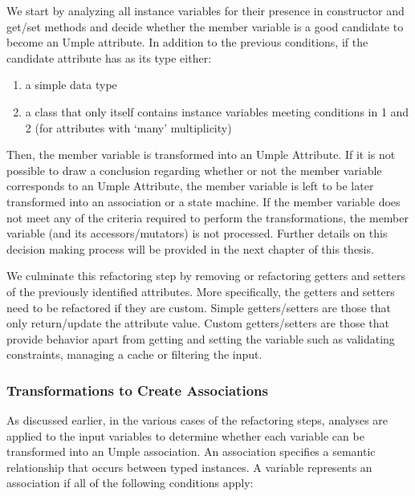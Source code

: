 We start by analyzing all instance variables for their presence in constructor and get/set methods and decide whether the member variable is a good candidate to become an Umple attribute. In addition to the previous conditions, if the candidate attribute has as its type either:

\begin{enumerate}
\item a simple data type
\item a class that only itself contains instance variables meeting conditions in 1 and 2 (for attributes with `many' multiplicity)
\end{enumerate}

Then, the member variable is transformed into an Umple Attribute. If it is not possible to draw a conclusion regarding whether or not the member variable corresponds to an Umple Attribute, the member variable is left to be later transformed into an association or a state machine. If the member variable does not meet any of the criteria required to perform the transformations, the member variable (and its accessors/mutators) is not processed. Further details on this decision making process will be provided in the next chapter of this thesis. 

We culminate this refactoring step by removing or refactoring getters and setters of the previously identified attributes. More specifically, the getters and setters need to be refactored if they are custom. Simple getters/setters are those that only return/update the attribute value.  Custom getters/setters are those that provide behavior apart from getting and setting the variable such as validating constraints, managing a cache or filtering the input.

\subsubsection{Transformations to Create Associations}

As discussed earlier, in the various cases of the refactoring steps, analyses are applied to the input variables to determine whether each variable can be transformed into an Umple association. An association specifies a semantic relationship that occurs between typed instances. A variable represents an association if all of the following conditions apply:

